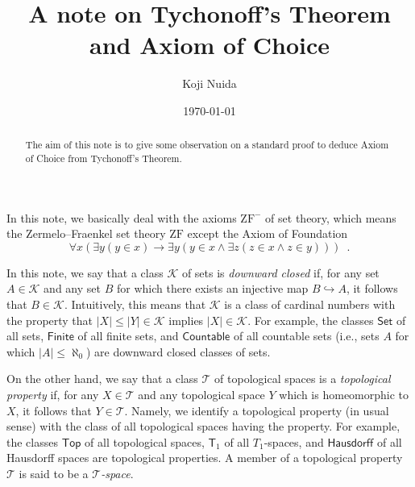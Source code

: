 \documentclass{article}
\title{A note on Tychonoff's Theorem and Axiom of Choice}
\author{Koji Nuida}
\date{\today}
\begin{document}
\maketitle

\begin{abstract}
The aim of this note is to give some observation on a standard proof to deduce Axiom of Choice from Tychonoff's Theorem.
\end{abstract}

In this note, we basically deal with the axioms $\mathrm{ZF}^-$ of set theory, which means the Zermelo--Fraenkel set theory $\mathrm{ZF}$ except the Axiom of Foundation
\begin{displaymath}
\forall x (\exists y (y \in x) \to \exists y (y \in x \land \exists z (z \in x \land z \in y))) \enspace.
\end{displaymath}

In this note, we say that a class $\mathcal{K}$ of sets is \emph{downward closed} if, for any set $A \in \mathcal{K}$ and any set $B$ for which there exists an injective map $B \hookrightarrow A$, it follows that $B \in \mathcal{K}$.
Intuitively, this means that $\mathcal{K}$ is a class of cardinal numbers with the property that $|X| \leq |Y| \in \mathcal{K}$ implies $|X| \in \mathcal{K}$.
For example, the classes $\mathsf{Set}$ of all sets, $\mathsf{Finite}$ of all finite sets, and $\mathsf{Countable}$ of all countable sets (i.e., sets $A$ for which $|A| \leq \aleph_0$) are downward closed classes of sets.

On the other hand, we say that a class $\mathcal{T}$ of topological spaces is a \emph{topological property} if, for any $X \in \mathcal{T}$ and any topological space $Y$ which is homeomorphic to $X$, it follows that $Y \in \mathcal{T}$.
Namely, we identify a topological property (in usual sense) with the class of all topological spaces having the property.
For example, the classes $\mathsf{Top}$ of all topological spaces, $\mathsf{T}_1$ of all $T_1$-spaces, and $\mathsf{Hausdorff}$ of all Hausdorff spaces are topological properties.
A member of a topological property $\mathcal{T}$ is said to be a \emph{$\mathcal{T}$-space}.
\end{document}
